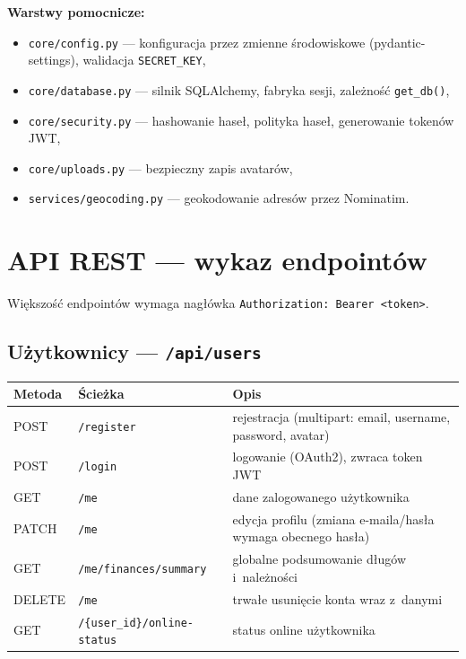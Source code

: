 \documentclass[11pt,a4paper]{article}
\begin{document}
\textbf{Warstwy pomocnicze:}
\begin{itemize}[noitemsep]
    \item \texttt{core/config.py} --- konfiguracja przez zmienne środowiskowe
          (pydantic-settings), walidacja \texttt{SECRET\_KEY},
    \item \texttt{core/database.py} --- silnik SQLAlchemy, fabryka sesji, zależność
          \texttt{get\_db()},
    \item \texttt{core/security.py} --- hashowanie haseł, polityka haseł, generowanie
          tokenów JWT,
    \item \texttt{core/uploads.py} --- bezpieczny zapis avatarów,
    \item \texttt{services/geocoding.py} --- geokodowanie adresów przez Nominatim.
\end{itemize}

\section{API REST --- wykaz endpointów}

Większość endpointów wymaga nagłówka \texttt{Authorization: Bearer <token>}.

\subsection{Użytkownicy --- \texttt{/api/users}}
\begin{longtable}{L{1.8cm} L{5cm} L{6cm}}
\toprule
\textbf{Metoda} & \textbf{Ścieżka} & \textbf{Opis} \\
\midrule
\endhead
POST & \texttt{/register} & rejestracja (multipart: email, username, password, avatar) \\
POST & \texttt{/login} & logowanie (OAuth2), zwraca token JWT \\
GET & \texttt{/me} & dane zalogowanego użytkownika \\
PATCH & \texttt{/me} & edycja profilu (zmiana e-maila/hasła wymaga obecnego hasła) \\
GET & \texttt{/me/finances/summary} & globalne podsumowanie długów i~należności \\
DELETE & \texttt{/me} & trwałe usunięcie konta wraz z~danymi \\
GET & \texttt{/\{user\_id\}/online-status} & status online użytkownika \\
\bottomrule
\end{longtable}
\end{document}
